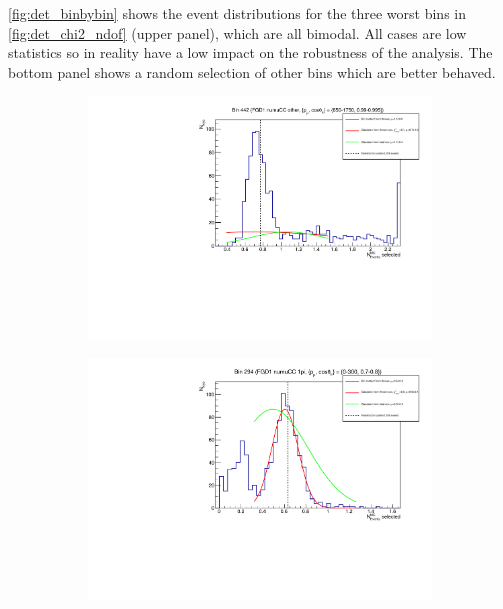 \autoref{fig:det_binbybin} shows the event distributions for the three worst bins in \autoref{fig:det_chi2_ndof} (upper panel), which are all bimodal. All cases are low statistics so in reality have a low impact on the robustness of the analysis. The bottom panel shows a random selection of other bins which are better behaved.
\begin{figure}[h]
	\begin{subfigure}[t]{0.32\textwidth}
		\includegraphics[width=\textwidth,page=1, trim={0mm 0mm 0mm 0mm}, clip]{figures/det/fdg1_numu_ccoth_bad}
	\end{subfigure}
	\begin{subfigure}[t]{0.32\textwidth}
		\includegraphics[width=\textwidth,page=1, trim={0mm 0mm 0mm 0mm}, clip]{figures/det/fgd1_numu_1pi_bad}
	\end{subfigure}

\end{figure}
